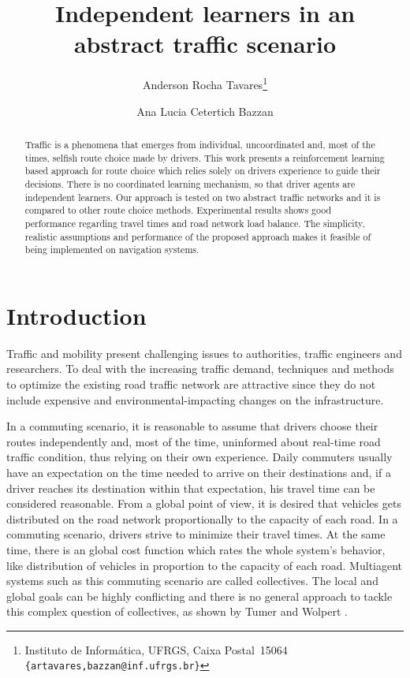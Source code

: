 \documentclass{RITA}
\author{
  Anderson Rocha Tavares\footnote{Instituto de Inform\'atica, UFRGS, Caixa Postal~15064\\
  \texttt{\{artavares,bazzan@inf.ufrgs.br\}}}
  \and Ana Lucia Cetertich Bazzan\footnotemark[1]
}
\title{Independent learners in an abstract traffic scenario}
\begin{document}
\maketitle

\begin{abstract}
Traffic is a phenomena that emerges from individual, uncoordinated and, most of the times, selfish route choice made by drivers. This work presents a reinforcement learning based approach for route choice which relies solely on drivers experience to guide their decisions. There is no coordinated learning mechanism, so that driver agents are independent learners. Our approach is tested on two abstract traffic networks and it is compared to other route choice methods. Experimental results shows good performance regarding travel times and road network load balance. The simplicity, realistic assumptions and performance of the proposed approach makes it feasible of being implemented on navigation systems.
\end{abstract}





\section{Introduction}
\label{sec:intro}

Traffic and mobility present challenging issues to authorities, traffic engineers and researchers. To deal with the increasing traffic demand, techniques and methods to optimize the existing road traffic network are attractive since they do not include expensive and environmental-impacting changes on the infrastructure.

In a commuting scenario, it is reasonable to assume that drivers choose their routes independently and, most of the time, uninformed about real-time road traffic condition, thus relying on their own experience. Daily commuters usually have an expectation on the time needed to arrive on their destinations and, if a driver reaches its destination within that expectation, his travel time can be considered  reasonable. From a global point of view, it is desired that vehicles gets distributed on the road network proportionally to the capacity of each road. In a commuting scenario, drivers strive to minimize their travel times. At the same time, there is an global cost function which rates the whole system's behavior, like distribution of vehicles in proportion to the capacity of each road. Multiagent systems such as this commuting scenario are called collectives. The local and global goals can be highly conflicting and there is no general approach to tackle this complex question of collectives, as shown by Tumer and Wolpert \cite{Tumer&Wolpert2004}.
\end{document}
